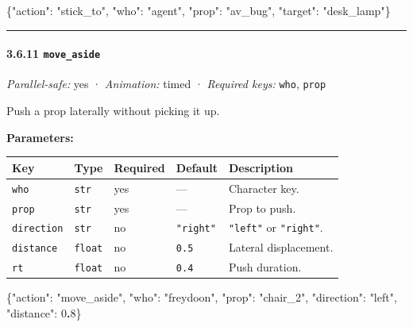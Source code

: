 \documentclass[
  11pt,
]{book}
\newenvironment{Shaded}{}{}
\newcommand{\DataTypeTok}[1]{\textcolor[rgb]{0.56,0.13,0.00}{#1}}
\newcommand{\DecValTok}[1]{\textcolor[rgb]{0.25,0.63,0.44}{#1}}
\newcommand{\ErrorTok}[1]{\textcolor[rgb]{1.00,0.00,0.00}{\textbf{#1}}}
\newcommand{\FunctionTok}[1]{\textcolor[rgb]{0.02,0.16,0.49}{#1}}
\newcommand{\StringTok}[1]{\textcolor[rgb]{0.25,0.44,0.63}{#1}}
\begin{document}
\begin{Shaded}
\begin{Highlighting}[]
\FunctionTok{\{}\DataTypeTok{"action"}\FunctionTok{:} \StringTok{"stick\_to"}\FunctionTok{,} \DataTypeTok{"who"}\FunctionTok{:} \StringTok{"agent"}\FunctionTok{,} \DataTypeTok{"prop"}\FunctionTok{:} \StringTok{"av\_bug"}\FunctionTok{,}
 \DataTypeTok{"target"}\FunctionTok{:} \StringTok{"desk\_lamp"}\FunctionTok{\}}
\end{Highlighting}
\end{Shaded}

\begin{center}\rule{0.5\linewidth}{0.5pt}\end{center}

\paragraph{\texorpdfstring{3.6.11
\texttt{move\_aside}}{3.6.11 move\_aside}}\label{move_aside}

\emph{Parallel-safe:} yes · \emph{Animation:} timed · \emph{Required
keys:} \texttt{who}, \texttt{prop}

Push a prop laterally without picking it up.

\textbf{Parameters:}

\begin{longtable}[]{@{}lllll@{}}
\toprule\noalign{}
Key & Type & Required & Default & Description \\
\midrule\noalign{}
\endhead
\bottomrule\noalign{}
\endlastfoot
\texttt{who} & \texttt{str} & yes & --- & Character key. \\
\texttt{prop} & \texttt{str} & yes & --- & Prop to push. \\
\texttt{direction} & \texttt{str} & no & \texttt{"right"} &
\texttt{"left"} or \texttt{"right"}. \\
\texttt{distance} & \texttt{float} & no & \texttt{0.5} & Lateral
displacement. \\
\texttt{rt} & \texttt{float} & no & \texttt{0.4} & Push duration. \\
\end{longtable}

\begin{Shaded}
\begin{Highlighting}[]
\FunctionTok{\{}\DataTypeTok{"action"}\FunctionTok{:} \StringTok{"move\_aside"}\FunctionTok{,} \DataTypeTok{"who"}\FunctionTok{:} \StringTok{"freydoon"}\FunctionTok{,} \DataTypeTok{"prop"}\FunctionTok{:} \StringTok{"chair\_2"}\FunctionTok{,}
 \DataTypeTok{"direction"}\FunctionTok{:} \StringTok{"left"}\FunctionTok{,} \DataTypeTok{"distance"}\FunctionTok{:} \DecValTok{0}\ErrorTok{.}\DecValTok{8}\FunctionTok{\}}
\end{Highlighting}
\end{Shaded}
\end{document}
